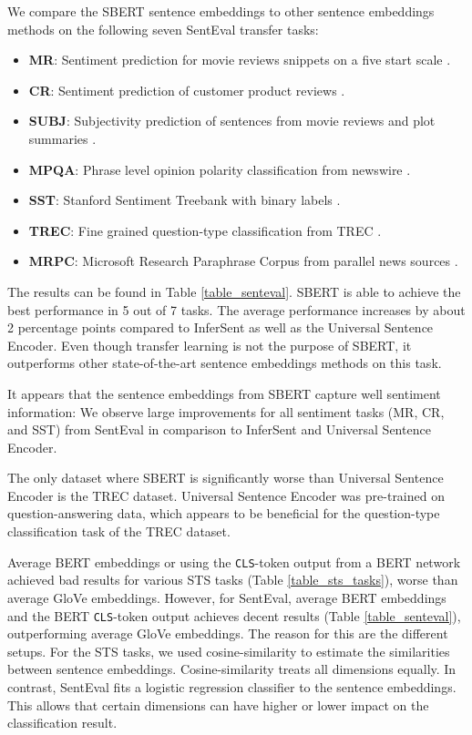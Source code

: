 \documentclass[11pt,a4paper]{article}
\begin{document}
We compare the SBERT sentence embeddings to other sentence embeddings methods on the following seven SentEval transfer tasks: 
\begin{itemize}
 \item \textbf{MR}: Sentiment prediction for movie reviews snippets on a five start scale \cite{pang-lee-2005-seeing}.

 \item \textbf{CR}: Sentiment prediction of customer product reviews \cite{Hu:2004}.

 \item \textbf{SUBJ}: Subjectivity prediction of sentences from movie reviews and plot summaries \cite{pang-lee-2004-sentimental}.

 \item \textbf{MPQA}: Phrase level opinion polarity classification from newswire \cite{Wiebe2005}.

 \item \textbf{SST}: Stanford Sentiment Treebank with binary labels \cite{socher-etal-2013-recursive}.

 \item \textbf{TREC}: Fine grained question-type classification from TREC \cite{Li2002}.

 \item \textbf{MRPC}:  Microsoft Research Paraphrase Corpus from parallel news sources \cite{Dolan2004}.
\end{itemize}

The results can be found in Table \ref{table_senteval}. SBERT is able to achieve the best performance in 5 out of 7 tasks. The average performance increases by about 2 percentage points compared to InferSent as well as the Universal Sentence Encoder. Even though transfer learning is not the purpose of SBERT, it outperforms other state-of-the-art sentence embeddings methods on this task.

It appears that the sentence embeddings from SBERT capture well sentiment information: We observe large improvements for all sentiment tasks (MR, CR, and SST) from SentEval in comparison to InferSent and Universal Sentence Encoder.

The only dataset where SBERT is significantly worse than Universal Sentence Encoder is the TREC dataset. Universal Sentence Encoder was pre-trained on question-answering data, which appears to be beneficial for the question-type classification task of the TREC dataset. 

 
Average BERT embeddings or using the \texttt{CLS}-token output from a BERT network achieved bad results for various STS tasks (Table \ref{table_sts_tasks}), worse than average GloVe embeddings. However, for Sent\-Eval, average BERT embeddings and the BERT \texttt{CLS}-token output achieves decent results (Table \ref{table_senteval}), outperforming average GloVe embeddings. The reason for this are the different setups. For the STS tasks, we used cosine-similarity to estimate the similarities between sentence embeddings. Cosine-similarity treats all dimensions equally. In contrast, SentEval fits a logistic regression classifier to the sentence embeddings. This allows that certain dimensions can have higher or lower impact on the classification result. 
\end{document}
